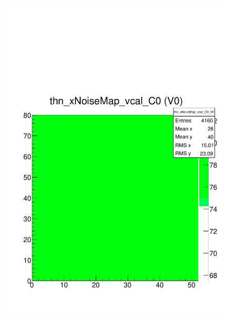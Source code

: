 \documentclass[a4paper,12pt,twoside]{article}
\begin{document}
\begin{figure} [h!]
\centering
\begin{minipage}{.48\textwidth}
  \centering
  \includegraphics[width=\textwidth]{./HRSCurves_thnMap.pdf}
  \label{HRSCurves-thnMap}
\end{minipage}%
\hspace{2mm}
\begin{minipage}{.48\textwidth}
  \centering

\end{minipage}
\end{figure}
\end{document}
